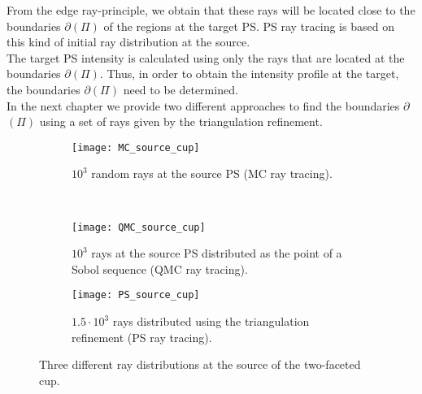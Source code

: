 From the edge ray-principle, we obtain that these rays will be located close to the boundaries $\partial$$(\Pi)$ of the regions at the target PS.
PS ray tracing is based on this kind of initial ray distribution at the source.
\\ \indent The target PS intensity is calculated using only the rays that are located at the boundaries $\partial$$(\Pi)$. Thus, in order to obtain the intensity profile at the target, the boundaries $\partial$$(\Pi)$ need to be determined.\\ \indent 
In the next chapter we provide two different approaches to find the boundaries $\partial$$(\Pi)$ using a set of rays given by the triangulation refinement.
\begin{figure}[h]
 \begin{subfigure}[t]{\textwidth}
\centering
    \texttt{[image: MC\_source\_cup]}
    \caption{$10^3$ random rays at the source PS (MC ray tracing).}
    \label{fig:mc_sample}
\end{subfigure}
\hfill
\\
\begin{subfigure}[t]{\textwidth}
\centering
    \texttt{[image: QMC\_source\_cup]}
    \caption{$10^3$ rays at the source PS distributed as the point of a Sobol sequence (QMC ray tracing).}
    \label{fig:qmc_sample}
\end{subfigure}
\hfill
\begin{subfigure}[t]{\textwidth}
\centering
\texttt{[image: PS\_source\_cup]}
\caption{$1.5\cdot10^3$ rays distributed using the triangulation refinement (PS ray tracing).}
\label{fig:ps_sample}
\end{subfigure}
\caption{Three different ray distributions at the source of the two-faceted cup.}
\label{fig:three_distributions}
\end{figure}

